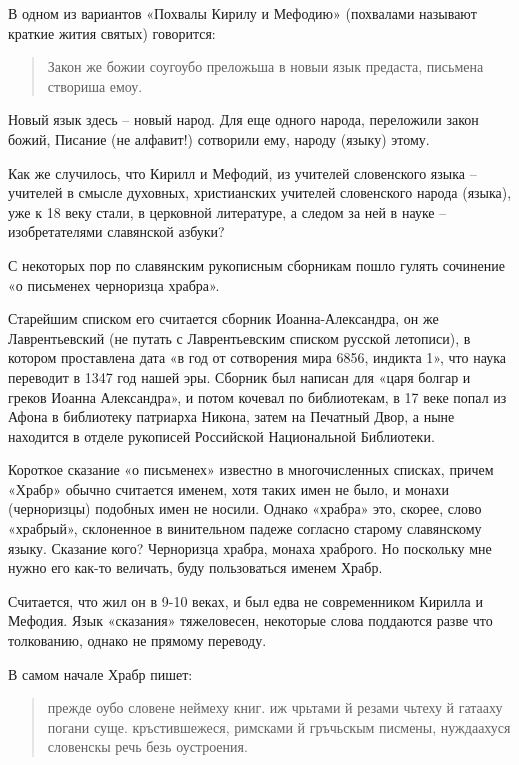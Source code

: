 В одном из вариантов «Похвалы Кирилу и Мефодию» (похвалами называют краткие жития святых) говорится:

\begin{quotation}
Закон же божии соугоубо преложьша в новыи язык предаста, письмена створиша емоу.
\end{quotation}

Новый язык здесь – новый народ. Для еще одного народа, переложили закон божий, Писание (не алфавит!) сотворили ему, народу (языку) этому. 

Как же случилось, что Кирилл и Мефодий, из учителей словенского языка – учителей в смысле духовных, христианских учителей словенского народа (языка), уже к 18 веку стали, в церковной литературе, а следом за ней в науке – изобретателями славянской азбуки?

С некоторых пор по славянским рукописным сборникам пошло гулять сочинение «о письменех черноризца храбра».

Старейшим списком его считается сборник Иоанна-Александра, он же Лаврентьевский (не путать с Лаврентьевским списком русской летописи), в котором проставлена дата «в год от сотворения мира 6856, индикта 1», что наука переводит в 1347 год нашей эры. Сборник был написан для «царя болгар и греков Иоанна Александра», и потом кочевал по библиотекам, в 17 веке попал из Афона в библиотеку патриарха Никона, затем на Печатный Двор, а ныне находится в отделе рукописей Российской Национальной Библиотеки.

Короткое сказание «о письменех» известно в многочисленных списках, причем «Храбр» обычно считается именем, хотя таких имен не было, и монахи (черноризцы) подобных имен не носили. Однако «храбра» это, скорее, слово «храбрый», склоненное в винительном падеже согласно старому славянскому языку. Сказание кого? Черноризца храбра, монаха храброго. Но поскольку мне нужно его как-то величать, буду пользоваться именем Храбр.

Считается, что жил он в 9-10 веках, и был едва не современником Кирилла и Мефодия. Язык «сказания» тяжеловесен, некоторые слова поддаются разве что толкованию, однако не прямому переводу.

В самом начале Храбр пишет:

\begin{quotation}
прежде оубо словене неймеху книг. иж чрьтами й резами чьтеху й гатааху погани суще. кръстившежеся, римсками й гръчьскым писмены, нуждаахуся словенскы речь безь оустроения.
\end{quotation}

